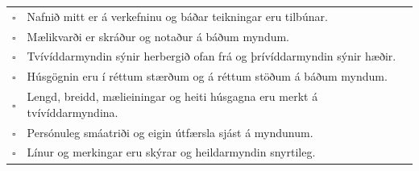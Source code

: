\documentclass[12pt,a4paper]{article}
\renewcommand{\arraystretch}{1.12}
\newcommand{\verkthattur}[1]{\par\vspace{3.5mm}{\bfseries\large #1\par}\vspace{1.5mm}}
\begin{document}
\vspace{3mm}
\verkthattur{Farðu yfir áður en þú skilar}
\begingroup
\fontsize{11.5}{14}\selectfont
\setlength{\tabcolsep}{4pt}
\renewcommand{\arraystretch}{1.2}
\begin{tabularx}{\linewidth}{@{}cY@{}}
\(\square\) & Nafnið mitt er á verkefninu og báðar teikningar eru tilbúnar. \\
\(\square\) & Mælikvarði er skráður og notaður á báðum myndum. \\
\(\square\) & Tvívíddarmyndin sýnir herbergið ofan frá og þrívíddarmyndin sýnir hæðir. \\
\(\square\) & Húsgögnin eru í réttum stærðum og á réttum stöðum á báðum myndum. \\
\(\square\) & Lengd, breidd, mælieiningar og heiti húsgagna eru merkt á tvívíddarmyndina. \\
\(\square\) & Persónuleg smáatriði og eigin útfærsla sjást á myndunum. \\
\(\square\) & Línur og merkingar eru skýrar og heildarmyndin snyrtileg. \\
\end{tabularx}
\endgroup
\end{document}
